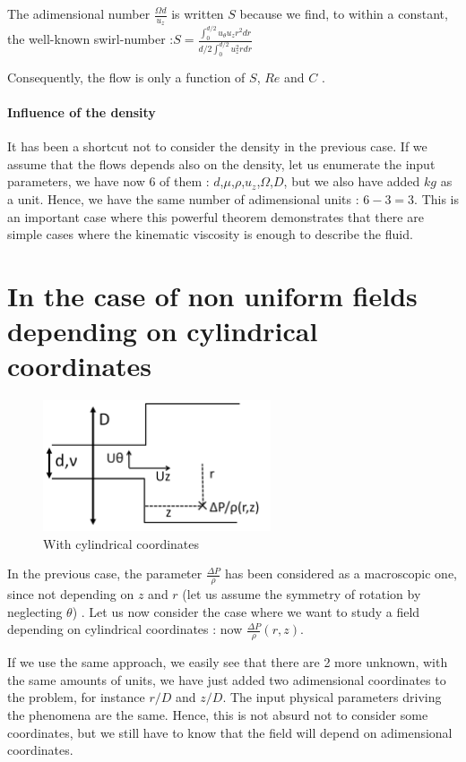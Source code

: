 The adimensional number $\frac{\Omega d}{u_{z}}$ is written $S$ because we find, to within a constant, the well-known swirl-number :$S=\frac{\int_{0}^{d/2} u_{\theta} u_{z} r^2 dr}{d/2\int_{0}^{d/2}  u_{z}^2 r dr}$ 

Consequently, the flow is only a function of $S$, $Re$ and $C$ .

\paragraph{Influence of the density}

It has been a shortcut not to consider the density in the previous case. If we assume that the flows depends also on the density, let us enumerate the input parameters, we have now 6 of them : $d$,$\mu$,$\rho$,$u_{z}$,$\Omega$,$D$, but we also have added $kg$ as a unit. Hence, we have the same number of adimensional units : $6-3=3$. This is an important case where this powerful theorem demonstrates that there are simple cases where the kinematic viscosity is enough to describe the fluid.

\section{In the case of non uniform fields depending on cylindrical coordinates}

\begin{figure}[!h]
  \centering
\includegraphics[width=0.6\textwidth]{fig/Schema_Vashy2.png}
  \caption{With cylindrical coordinates}
 \label{Vaschy2}
\end{figure}
In the previous case, the parameter $\frac{\Delta P}{\rho}$ has been considered as a macroscopic one, since not depending on $z$ and $r$ (let us assume the symmetry of rotation by neglecting $\theta$) . Let us now consider the case where we want to study a field depending on cylindrical coordinates : now $\frac{\Delta P}{\rho}(r,z)$. 

If we use the same approach, we easily see that there are 2 more unknown, with the same amounts of units, we have just added two adimensional coordinates to the problem, for instance $r/D$ and $z/D$. The input physical parameters driving the phenomena are the same. Hence, this is not absurd not to consider some coordinates, but we still have to know that the field will depend on adimensional coordinates.

